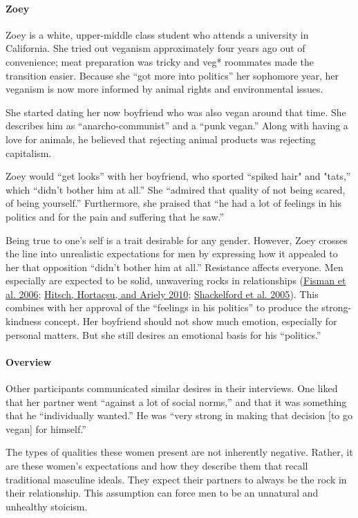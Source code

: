 \documentclass[twoside]{report}
\begin{document}
\begin{multicols*}{2}
\paragraph{Zoey}

Zoey is a white, upper-middle class student who attends a university in
California. She tried out veganism approximately four years ago out of
convenience; meat preparation was tricky and veg* roommates made the transition easier. Because she ``got more into politics'' her sophomore year, her veganism is now more informed by animal rights and environmental issues.

She started dating her now boyfriend who was also vegan around that time. She describes him as ``anarcho-communist'' and a ``punk vegan.'' Along with having a love for animals, he believed that rejecting animal products was rejecting capitalism.

Zoey would ``get looks'' with her boyfriend, who sported ``spiked hair" and
"tats,'' which ``didn't bother him at all.'' She ``admired that quality
of not being scared, of being yourself.'' Furthermore, she praised that
``he had a lot of feelings in his politics and for the pain and
suffering that he saw.''

Being true to one's self is a trait desirable for any gender. However,
Zoey crosses the line into unrealistic expectations for men by
expressing how it appealed to her that opposition ``didn't bother him at
all.'' Resistance affects everyone. Men especially are expected to be
solid, unwavering rocks in relationships (\hyperlink{fisman}{Fisman et al. 2006}; \hyperlink{hitsch2}{Hitsch, Hortaçsu, and Ariely 2010}; \hyperlink{shackelford}{Shackelford et al. 2005}). This combines
with her approval of the ``feelings in his politics'' to produce the
strong-kindness concept. Her boyfriend should not show much emotion,
especially for personal matters. But she still desires an emotional
basis for his ``politics.''
%
\paragraph{Overview}

Other participants communicated similar desires in their interviews. One
liked that her partner went ``against a lot of social norms,'' and that
it was something that he ``individually wanted.'' He was ``very strong
in making that decision {[}to go vegan{]} for himself.''

The types of qualities these women present are not inherently negative.
Rather, it are these women's expectations and how they describe them
that recall traditional masculine ideals. They expect their partners to
always be the rock in their relationship. This assumption can force men
to be an unnatural and unhealthy stoicism. 


\end{multicols*}
\end{document}
